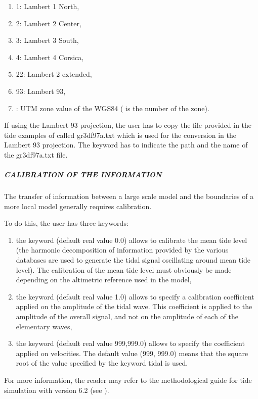 \begin{enumerate}
\item [\nonumber] 1: Lambert 1 North,

\item [\nonumber] 2: Lambert 2 Center,

\item [\nonumber] 3: Lambert 3 South,

\item [\nonumber] 4: Lambert 4 Corsica,

\item [\nonumber] 22: Lambert 2 extended,

\item [\nonumber] 93: Lambert 93,

\item [\nonumber] : UTM zone value of the WGS84 ( is the number of the zone).
\end{enumerate}


If using the Lambert 93 projection, the user has to copy the file provided
in the tide examples of  called gr3df97a.txt which is used
for the conversion in the Lambert 93 projection.
The keyword  has to indicate the path
and the name of the gr3df97a.txt file.

\subparagraph{ CALIBRATION OF THE INFORMATION}

 The transfer of information between a large scale model and the boundaries of a more local model generally requires calibration.

 To do this, the user has three keywords:

\begin{enumerate}
\item  the keyword  (default real value 0.0) allows to calibrate the mean tide level (the harmonic decomposition of information provided by the various databases are used to generate the tidal signal oscillating around mean tide level). The calibration of the mean tide level must obviously be made depending on the altimetric reference used in the model,

\item  the keyword  (default real value 1.0) allows to specify a calibration coefficient applied on the amplitude of the tidal wave. This coefficient is applied to the amplitude of the overall signal, and not on the amplitude of each of the elementary waves,

\item  the keyword  (default real value 999,999.0) allows to specify the coefficient applied on velocities. The default value (999, 999.0) means that the square root of the value specified by the keyword  tidal is used.
\end{enumerate}

 For more information, the reader may refer to the methodological guide for tide simulation with version 6.2 (see \cite{Pham2012}).
